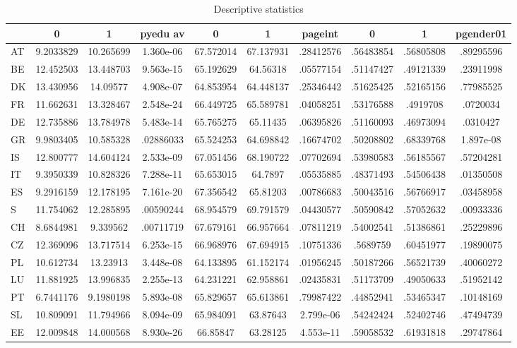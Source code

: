 \begin{table}[htbp]
\caption{\label{clabel} Descriptive statistics}\centering\medskip
\begin{tabular}{|l|c|c|c|c|c|c|c|c|c|}\hline  
 & 0  & 1  & pyedu av  & 0  & 1  & pageint  & 0  & 1  & pgender01  \\ \hline  
AT & 9.2033829 & 10.265699 & 1.360e-06 & 67.572014 & 67.137931 & .28412576 & .56483854 & .56805808 & .89295596 \\ \hline 
BE & 12.452503 & 13.448703 & 9.563e-15 & 65.192629 & 64.56318 & .05577154 & .51147427 & .49121339 & .23911998 \\ \hline 
DK & 13.430956 & 14.09577 & 4.908e-07 & 64.853954 & 64.448137 & .25346442 & .51625425 & .52165156 & .77985525 \\ \hline 
FR & 11.662631 & 13.328467 & 2.548e-24 & 66.449725 & 65.589781 & .04058251 & .53176588 & .4919708 & .0720034 \\ \hline 
DE & 12.735886 & 13.784978 & 5.483e-14 & 65.765275 & 65.11435 & .06395826 & .51160093 & .46973094 & .0310427 \\ \hline 
GR & 9.9803405 & 10.585328 & .02886033 & 65.524253 & 64.698842 & .16674702 & .50208802 & .68339768 & 1.897e-08 \\ \hline 
IS & 12.800777 & 14.604124 & 2.533e-09 & 67.051456 & 68.190722 & .07702694 & .53980583 & .56185567 & .57204281 \\ \hline 
IT & 9.3950339 & 10.828326 & 7.288e-11 & 65.653015 & 64.7897 & .05535885 & .48371493 & .54506438 & .01350508 \\ \hline 
ES & 9.2916159 & 12.178195 & 7.161e-20 & 67.356542 & 65.81203 & .00786683 & .50043516 & .56766917 & .03458958 \\ \hline 
S & 11.754062 & 12.285895 & .00590244 & 68.954579 & 69.791579 & .04430577 & .50590842 & .57052632 & .00933336 \\ \hline 
CH & 8.6844981 & 9.339562 & .00711719 & 67.679161 & 66.957664 & .07811219 & .54002541 & .51386861 & .25229896 \\ \hline 
CZ & 12.369096 & 13.717514 & 6.253e-15 & 66.968976 & 67.694915 & .10751336 & .5689759 & .60451977 & .19890075 \\ \hline 
PL & 10.612734 & 13.23913 & 3.448e-08 & 64.133895 & 61.152174 & .01956245 & .50187266 & .56521739 & .40060272 \\ \hline 
LU & 11.881925 & 13.996835 & 2.255e-13 & 64.231221 & 62.958861 & .02435831 & .51173709 & .49050633 & .51952142 \\ \hline 
PT & 6.7441176 & 9.1980198 & 5.893e-08 & 65.829657 & 65.613861 & .79987422 & .44852941 & .53465347 & .10148169 \\ \hline 
SL & 10.809091 & 11.794966 & 8.094e-09 & 65.984091 & 63.87643 & 2.799e-06 & .54242424 & .52402746 & .47494739 \\ \hline 
EE & 12.009848 & 14.000568 & 8.930e-26 & 66.85847 & 63.28125 & 4.553e-11 & .59058532 & .61931818 & .29747864 \\ \hline 
  \end{tabular}
\end{table}
